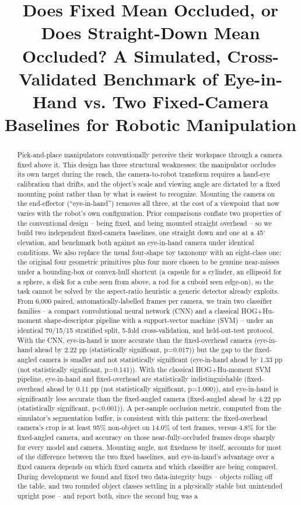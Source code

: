 \documentclass[conference]{IEEEtran}
\title{Does Fixed Mean Occluded, or Does Straight-Down Mean Occluded? A Simulated, Cross-Validated Benchmark of Eye-in-Hand vs. Two Fixed-Camera Baselines for Robotic Manipulation}
\author{
\IEEEauthorblockN{Yugandhar Kulkarni}
\IEEEauthorblockA{DES Pune University \\ DRDO Research Intern \\ github.com/yugandhar-k}
}
\begin{document}
\maketitle

\begin{abstract}
Pick-and-place manipulators conventionally perceive their workspace through a camera fixed above it. This design has three structural weaknesses: the manipulator occludes its own target during the reach, the camera-to-robot transform requires a hand-eye calibration that drifts, and the object's scale and viewing angle are dictated by a fixed mounting point rather than by what is easiest to recognize. Mounting the camera on the end-effector (``eye-in-hand'') removes all three, at the cost of a viewpoint that now varies with the robot's own configuration. Prior comparisons conflate two properties of the conventional design -- being fixed, and being mounted straight overhead -- so we build two independent fixed-camera baselines, one straight down and one at a 45$^\circ$ elevation, and benchmark both against an eye-in-hand camera under identical conditions. We also replace the usual four-shape toy taxonomy with an eight-class one: the original four geometric primitives plus four more chosen to be genuine near-misses under a bounding-box or convex-hull shortcut (a capsule for a cylinder, an ellipsoid for a sphere, a disk for a cube seen from above, a rod for a cuboid seen edge-on), so the task cannot be solved by the aspect-ratio heuristic a generic detector already exploits. From 6,000 paired, automatically-labelled frames per camera, we train two classifier families -- a compact convolutional neural network (CNN) and a classical HOG+Hu-moment shape-descriptor pipeline with a support-vector machine (SVM) -- under an identical 70/15/15 stratified split, 5-fold cross-validation, and held-out-test protocol. With the CNN, eye-in-hand is more accurate than the fixed-overhead camera (eye-in-hand ahead by 2.22 pp (statistically significant, p=0.017)) but the gap to the fixed-angled camera is smaller and not statistically significant (eye-in-hand ahead by 1.33 pp (not statistically significant, p=0.141)). With the classical HOG+Hu-moment SVM pipeline, eye-in-hand and fixed-overhead are statistically indistinguishable (fixed-overhead ahead by 0.11 pp (not statistically significant, p=1.000)), and eye-in-hand is significantly less accurate than the fixed-angled camera (fixed-angled ahead by 4.22 pp (statistically significant, p<0.001)). A per-sample occlusion metric, computed from the simulator's segmentation buffer, is consistent with this pattern: the fixed-overhead camera's crop is at least 95\% non-object on 14.0\% of test frames, versus 4.8\% for the fixed-angled camera, and accuracy on those near-fully-occluded frames drops sharply for every model and camera. Mounting angle, not fixedness by itself, accounts for most of the difference between the two fixed baselines, and eye-in-hand's advantage over a fixed camera depends on which fixed camera and which classifier are being compared. During development we found and fixed two data-integrity bugs -- objects rolling off the table, and two rounded object classes settling in a physically stable but unintended upright pose -- and report both, since the second bug was a 
\end{abstract}
\end{document}
